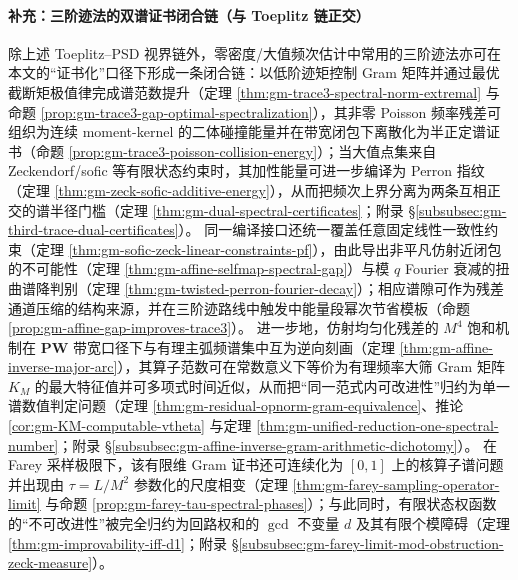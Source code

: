 \paragraph{补充：三阶迹法的双谱证书闭合链（与 Toeplitz 链正交）}
除上述 Toeplitz--PSD 视界链外，零密度/大值频次估计中常用的三阶迹法亦可在本文的“证书化”口径下形成一条闭合链：以低阶迹矩控制 Gram 矩阵并通过最优截断矩极值律完成谱范数提升（定理 \ref{thm:gm-trace3-spectral-norm-extremal} 与命题 \ref{prop:gm-trace3-gap-optimal-spectralization}），其非零 Poisson 频率残差可组织为连续 moment-kernel 的二体碰撞能量并在带宽闭包下离散化为半正定谱证书（命题 \ref{prop:gm-trace3-poisson-collision-energy}）；当大值点集来自 Zeckendorf/sofic 等有限状态约束时，其加性能量可进一步编译为 Perron 指纹（定理 \ref{thm:gm-zeck-sofic-additive-energy}），从而把频次上界分离为两条互相正交的谱半径门槛（定理 \ref{thm:gm-dual-spectral-certificates}；附录 \S\ref{subsubsec:gm-third-trace-dual-certificates}）。
同一编译接口还统一覆盖任意固定线性一致性约束（定理 \ref{thm:gm-sofic-zeck-linear-constraints-pf}），由此导出非平凡仿射近闭包的不可能性（定理 \ref{thm:gm-affine-selfmap-spectral-gap}）与模 \(q\) Fourier 衰减的扭曲谱降判别（定理 \ref{thm:gm-twisted-perron-fourier-decay}）；相应谱隙可作为残差通道压缩的结构来源，并在三阶迹路线中触发中能量段幂次节省模板（命题 \ref{prop:gm-affine-gap-improves-trace3}）。
进一步地，仿射均匀化残差的 \(M^4\) 饱和机制在 \(\mathbf{PW}\) 带宽口径下与有理主弧频谱集中互为逆向刻画（定理 \ref{thm:gm-affine-inverse-major-arc}），其算子范数可在常数意义下等价为有理频率大筛 Gram 矩阵 \(K_M\) 的最大特征值并可多项式时间近似，从而把“同一范式内可改进性”归约为单一谱数值判定问题（定理 \ref{thm:gm-residual-opnorm-gram-equivalence}、推论 \ref{cor:gm-KM-computable-vtheta} 与定理 \ref{thm:gm-unified-reduction-one-spectral-number}；附录 \S\ref{subsubsec:gm-affine-inverse-gram-arithmetic-dichotomy}）。
在 Farey 采样极限下，该有限维 Gram 证书还可连续化为 \([0,1]\) 上的核算子谱问题并出现由 \(\tau=L/M^2\) 参数化的尺度相变（定理 \ref{thm:gm-farey-sampling-operator-limit} 与命题 \ref{prop:gm-farey-tau-spectral-phases}）；与此同时，有限状态权函数的“不可改进性”被完全归约为回路权和的 \(\gcd\) 不变量 \(d\) 及其有限个模障碍（定理 \ref{thm:gm-improvability-iff-d1}；附录 \S\ref{subsubsec:gm-farey-limit-mod-obstruction-zeck-measure}）。

